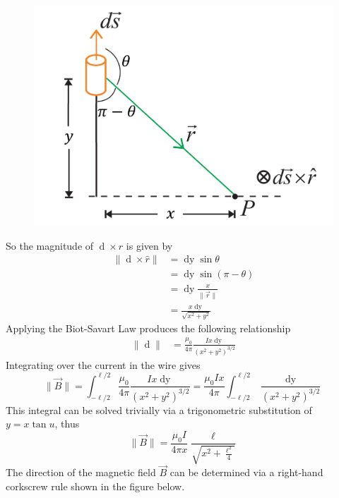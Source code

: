 \begin{figure}[h!]
    \centering
    \includegraphics[scale=0.35]{notes/images/Magnetic-Field-Wire-P-2.JPG}
\end{figure}
\FloatBarrier

So the magnitude of $\mathop{\mathrm{d}\vec{s}} \times \hat{r}$ is given by
\begin{align}
    \| \mathop{\mathrm{d}\vec{s}} \times \hat{r} \| &= \mathop{\mathrm{d}y} \sin \theta \\
    &= \mathop{\mathrm{d}y} \sin (\pi - \theta) \\
    &= \mathop{\mathrm{d}y} \frac{x}{\| \vec{r} \|} \\
    &= \frac{x \mathop{\mathrm{d}y}}{\sqrt{x^2 + y^2}}
\end{align}
Applying the Biot-Savart Law produces the following relationship
\begin{align}
    \| \mathop{\mathrm{d}\vec{B}} \| &= \frac{\mu_0}{4\pi} \frac{Ix \mathop{\mathrm{d}y}}{(x^2 + y^2)^{3/2}}
\end{align}
Integrating over the current in the wire gives
\begin{equation}
    \| \vec{B} \| = \int_{-\ell/2}^{\ell/2} \frac{\mu_0}{4\pi} \frac{Ix \mathop{\mathrm{d}y}}{(x^2 + y^2)^{3/2}} = \frac{\mu_0 I x}{4 \pi} \int_{-\ell/2}^{\ell/2} \frac{\mathop{\mathrm{d}y}}{(x^2 + y^2)^{3/2}}
\end{equation}
This integral can be solved trivially via a trigonometric substitution of $y = x \tan u$, thus
\begin{equation}
    \| \vec{B} \| = \frac{\mu_0I}{4\pi x} \frac{\ell}{\sqrt{x^2 + \frac{\ell^2}{4}}}
\end{equation}
The direction of the magnetic field $\vec{B}$ can be determined via a right-hand corkscrew rule shown in the figure below. 

